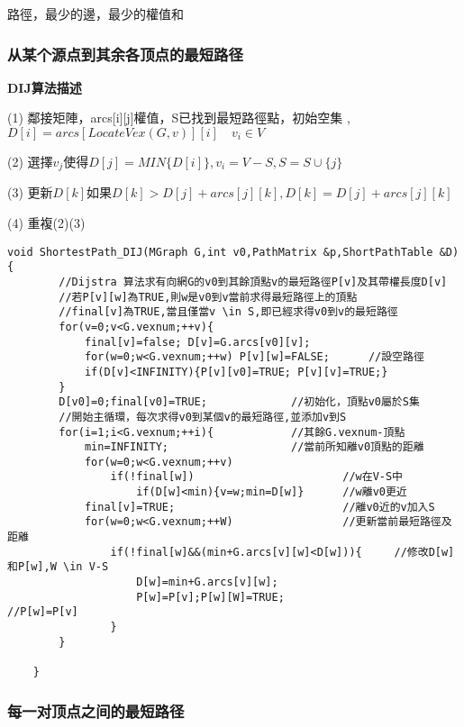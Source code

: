 \documentclass[UTF8]{ctexart}
\newcommand{\mb}[1]{\textbf{#1}}
\newcommand{\q}{\quad}
\newcommand{\p}{\par}
\begin{document}
路徑，最少的邊，最少的權值和

 
\subsubsection{从某个源点到其余各顶点的最短路径}

\mb{DIJ算法描述}\p

\q(1) 鄰接矩陣，arcs[i][j]權值，S已找到最短路徑點，初始空集 ,$D[i]=arcs[LocateVex(G,v)][i] \q v_i \in V$ 

\q(2) 選擇$v_j$使得$D[j]=MIN\{D[i]\} ,v_i=V-S,S=S \cup \{j\}$

\q(3) 更新$D[k]$如果$D[k]>D[j]+arcs[j][k],D[k]=D[j]+arcs[j][k]$

\q(4) 重複(2)(3)

\newpage

\begin{lstlisting}[style=v1]
    void ShortestPath_DIJ(MGraph G,int v0,PathMatrix &p,ShortPathTable &D){
        //Dijstra 算法求有向網G的v0到其餘頂點v的最短路徑P[v]及其帶權長度D[v]
        //若P[v][w]為TRUE,則w是v0到v當前求得最短路徑上的頂點
        //final[v]為TRUE,當且僅當v \in S,即已經求得v0到v的最短路徑    
        for(v=0;v<G.vexnum;++v){
            final[v]=false; D[v]=G.arcs[v0][v];
            for(w=0;w<G.vexnum;++w) P[v][w]=FALSE;      //設空路徑
            if(D[v]<INFINITY){P[v][v0]=TRUE; P[v][v]=TRUE;}
        }
        D[v0]=0;final[v0]=TRUE;             //初始化，頂點v0屬於S集
        //開始主循環，每次求得v0到某個v的最短路徑,並添加v到S
        for(i=1;i<G.vexnum;++i){            //其餘G.vexnum-頂點
            min=INFINITY;                   //當前所知離v0頂點的距離
            for(w=0;w<G.vexnum;++v)
                if(!final[w])                       //w在V-S中
                    if(D[w]<min){v=w;min=D[w]}      //w離v0更近
            final[v]=TRUE;                          //離v0近的v加入S
            for(w=0;w<G.vexnum;++W)                 //更新當前最短路徑及距離
                if(!final[w]&&(min+G.arcs[v][w]<D[w])){     //修改D[w]和P[w],W \in V-S
                    D[w]=min+G.arcs[v][w];
                    P[w]=P[v];P[w][W]=TRUE;                 //P[w]=P[v]
                }    
        }

    }
\end{lstlisting}



\subsubsection{每一对顶点之间的最短路径}
\end{document}
